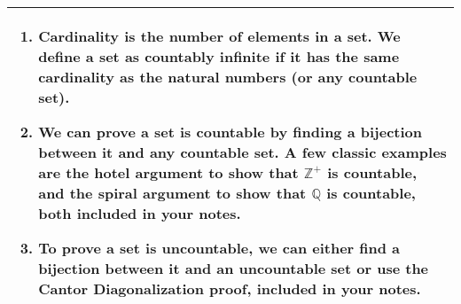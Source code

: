 {\tabulinesep=1mm
\begin{tabu}{|p{16cm} |}
\hline
\begin{enumerate}[label=(\alph*.)] 
\item 
Cardinality is the number of elements in a set. We define a set as countably infinite if it has the same cardinality as the natural numbers (or any countable set). 


\item 
We can prove a set is countable by finding a bijection between it and any countable set. A few classic examples are the hotel argument to show that $\mathbb{Z}^+$ is countable, and the spiral argument to show that $\mathbb{Q}$ is countable, both included in your notes. 
\item 
To prove a set is uncountable, we can either find a bijection between it and an uncountable set or use the Cantor Diagonalization proof, included in your notes. 


\end{enumerate}
\\
\hline
\end{tabu}
}
